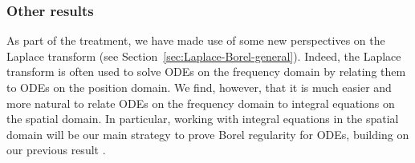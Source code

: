 \documentclass{article}
\theoremstyle{definition}
\newtheorem{remark}[definition]{Remark}
\theoremstyle{plain}
\begin{document}
\color{black}
%     
\subsubsection{Other results}
%
As part of the treatment, we have made use of some new perspectives on the Laplace transform (see Section~\ref{sec:Laplace-Borel-general}). Indeed, the Laplace transform is often used to solve ODEs on the frequency domain by relating them to ODEs on the position domain. We find, however, that it is much easier and more natural to relate ODEs on the frequency domain to integral equations on the spatial domain. In particular, working with integral equations in the spatial domain will be our main strategy to prove Borel regularity for ODEs, building on our previous result \cite[Theorem 4]{reg-sing-volterra}. 
\end{document}
